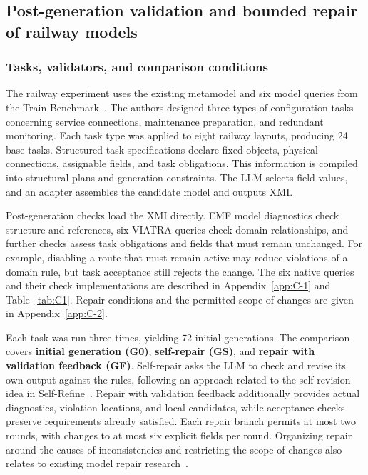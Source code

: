 \documentclass[pdflatex,iicol,sn-mathphys-num]{sn-jnl}
\newcommand{\paperref}[1]{~\citep{#1}}
\begin{document}
\subsection{Post-generation validation and bounded repair of railway models}\label{sec:eval-4-4}

\subsubsection{Tasks, validators, and comparison conditions}\label{sec:eval-4-4-1}

The railway experiment uses the existing metamodel and six model queries from the Train Benchmark\paperref{Szarnyas2018}. The authors designed three types of configuration tasks concerning service connections, maintenance preparation, and redundant monitoring. Each task type was applied to eight railway layouts, producing 24 base tasks. Structured task specifications declare fixed objects, physical connections, assignable fields, and task obligations. This information is compiled into structural plans and generation constraints. The LLM selects field values, and an adapter assembles the candidate model and outputs XMI.


Post-generation checks load the XMI directly. EMF model diagnostics check structure and references, six VIATRA queries check domain relationships, and further checks assess task obligations and fields that must remain unchanged. For example, disabling a route that must remain active may reduce violations of a domain rule, but task acceptance still rejects the change. The six native queries and their check implementations are described in Appendix~\ref{app:C-1} and Table~\ref{tab:C1}. Repair conditions and the permitted scope of changes are given in Appendix~\ref{app:C-2}.


Each task was run three times, yielding 72 initial generations. The comparison covers \textbf{initial generation (G0)}, \textbf{self-repair (GS)}, and \textbf{repair with validation feedback (GF)}. Self-repair asks the LLM to check and revise its own output against the rules, following an approach related to the self-revision idea in Self-Refine\paperref{NEURIPS2023_91edff07}. Repair with validation feedback additionally provides actual diagnostics, violation locations, and local candidates, while acceptance checks preserve requirements already satisfied. Each repair branch permits at most two rounds, with changes to at most six explicit fields per round. Organizing repair around the causes of inconsistencies and restricting the scope of changes also relates to existing model repair research\paperref{Marchezan2023}.
\end{document}
